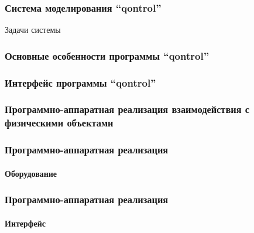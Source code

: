 \documentclass[10pt,utf8]{beamer}
\begin{document}

\begin{frame}
  \frametitle{Система моделирования ``qontrol''}

  Задачи системы


\end{frame}




\begin{frame}
  \frametitle{Основные особенности программы ``qontrol''}


\end{frame}




\begin{frame}
  \frametitle{Интерфейс программы ``qontrol''}


\end{frame}




\begin{frame}
  \frametitle{Программно-аппаратная реализация взаимодействия с физическими объектами}


\end{frame}




\begin{frame}
  \frametitle{Программно-аппаратная реализация }
  \framesubtitle{Оборудование}


\end{frame}



\begin{frame}
  \frametitle{Программно-аппаратная реализация }
  \framesubtitle{Интерфейс}


\end{frame}



\end{document}
